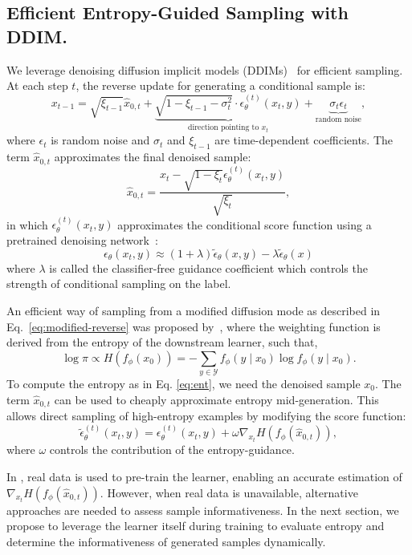 \subsection{Efficient Entropy-Guided Sampling with DDIM.} 

We leverage denoising diffusion implicit models (DDIMs)~\citep{song2020denoising} for efficient sampling. At each step \( t \), the reverse update for generating a conditional sample is:
{
\begin{equation*}
    x_{t-1} = \sqrt{\xi_{t-1}} \hat{x}_{0, t} + \underbrace{\sqrt{1 - \xi_{t-1} - \sigma_t^2} \cdot \epsilon_\theta^{(t)}(x_t, y)}_{\text{direction pointing to } x_t} + \underbrace{\sigma_t \epsilon_t}_{\text{random noise}},
\end{equation*}}
where \( \epsilon_t \) is random noise and \( \sigma_t \) and \( \xi_{t-1} \) are time-dependent coefficients. The term \( \hat{x}_{0, t} \) approximates the final denoised sample:
\begin{equation}
    \hat{x}_{0, t} = \frac{x_t - \sqrt{1 - \xi_t} \epsilon_\theta^{(t)}(x_t, y)}{\sqrt{\xi_t}},
\end{equation}
in which $\epsilon_\theta^{(t)}(x_t, y)$ approximates the conditional score function using a pretrained denoising network~\citep{ho2022classifier}:
{
\begin{equation}
    \epsilon_\theta(x_t, y) \approx (1+\lambda)\tilde{\epsilon}_\theta(x, y) - \lambda \tilde{\epsilon}_{\theta}(x)
\end{equation}
}
where $\lambda$ is called the classifier-free guidance coefficient which controls the strength of conditional sampling on the label.

An efficient way of sampling from a modified diffusion mode as described in Eq.~\ref{eq:modified-reverse} was proposed by~\citet{hemmat2023feedback}, where the weighting function is derived from the entropy of the downstream learner, such that,
{
\begin{equation}
    \label{eq:ent}
    \log \pi \propto H(f_\phi(x_0)) = - \sum_{y \in \mathcal{Y}} f_\phi(y \mid x_0) \log f_\phi(y \mid x_0).
\end{equation}}
To compute the entropy as in Eq. \ref{eq:ent}, we need the denoised sample $x_0$. The term \( \hat{x}_{0, t} \) can be used to cheaply approximate entropy mid-generation. This allows direct sampling of high-entropy examples by modifying the score function:
{
\begin{equation}
    \tilde{\epsilon}_\theta^{(t)}(x_t, y) = \epsilon_\theta^{(t)}(x_t, y) + \omega \nabla_{x_t} H(f_\phi(\hat{x}_{0, t})),
\end{equation}}
where $\omega$ controls the contribution of the entropy-guidance.

In \cite{hemmat2023feedback}, real data is used to pre-train the learner, enabling an accurate estimation of \( \nabla_{x_t} H(f_\phi(\hat{x}_{0, t})) \). However, when real data is unavailable, alternative approaches are needed to assess sample informativeness. In the next section, we propose to leverage the learner itself during training to evaluate entropy and determine the informativeness of generated samples dynamically.


